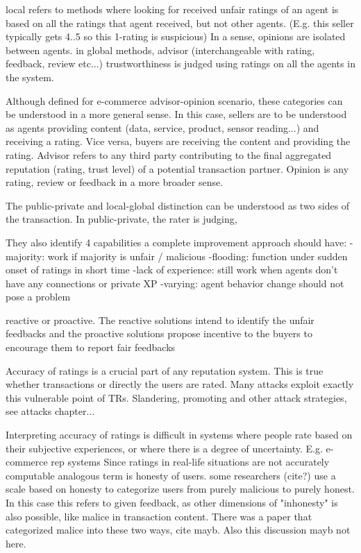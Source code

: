 \documentclass[%
    ]{\PathToTumTemplate/thesis/tum_thesis}
\begin{document}
local refers to methods where looking for received unfair ratings of an agent is based on all the ratings that agent received, but not other agents. (E.g. this seller typically gets 4..5 so this 1-rating is suspicious) In a sense, opinions are isolated between agents.
in global methods, advisor (interchangeable with rating, feedback, review etc...) trustworthiness is judged using ratings on all the agents in the system.


Although defined for e-commerce advisor-opinion scenario, these categories can be understood in a more general sense. In this case, sellers are to be understood as agents providing content (data, service, product, sensor reading...) and receiving a rating. Vice versa, buyers are receiving the content and providing the rating. Advisor refers to any third party contributing to the final aggregated reputation (rating, trust level) of a potential transaction partner. Opinion is any rating, review or feedback in a more broader sense.

The public-private and local-global distinction can be understood as two sides of the transaction. In public-private, the rater is judging, 

They also identify 4 capabilities a complete improvement approach should have:
-majority: work if majority is unfair / malicious
-flooding: function under sudden onset of ratings in short time
-lack of experience: still work when agents don't have any connections or private XP
-varying: agent behavior change should not pose a problem

reactive or proactive. The reactive solutions intend to identify the unfair feedbacks and the proactive solutions propose incentive to the buyers to encourage them to report fair feedbacks \cite{thakur_reputation_2019}





Accuracy of ratings is a crucial part of any reputation system. This is true whether transactions or directly the users are rated. 
Many attacks exploit exactly this vulnerable point of TRs. Slandering, promoting and other attack strategies, see attacks chapter...

Interpreting accuracy of ratings is difficult in systems where people rate based on their subjective experiences, or where there is a degree of uncertainty. E.g. e-commerce rep systems
Since ratings in real-life situations are not accurately computable
analogous term is honesty of users. some researchers (cite?) use a scale based on honesty to categorize users from purely malicious to purely honest. In this case this refers to given feedback, as other dimensions of "inhonesty" is also possible, like malice in transaction content. There was a paper that categorized malice into these two ways, cite mayb. Also this discussion mayb not here.
\end{document}
